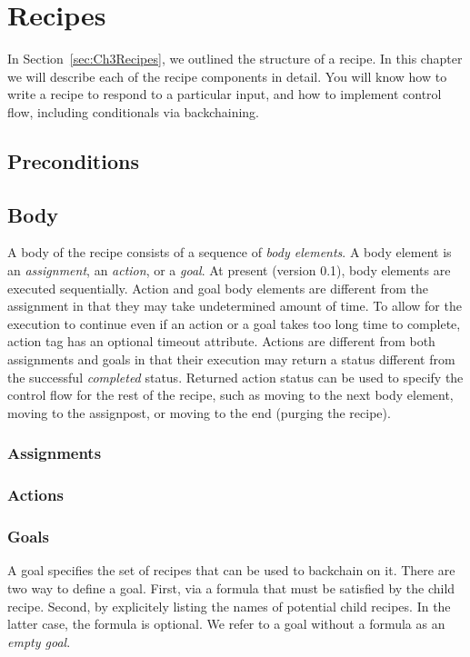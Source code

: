 \chapter{Recipes}
\label{Chapter4}

In Section~\ref{sec:Ch3Recipes}, we outlined the structure of a recipe. In this chapter we will describe each of the recipe components in detail. You will know how to write a recipe to respond to a particular input, and how to implement control flow, including conditionals via backchaining.



\section{Preconditions}
\section{Body}

A body of the recipe consists of a sequence of \textsl{body elements}. A body element is an \textsl{assignment}, an \textsl{action}, or a \textsl{goal}. At present (version 0.1), body elements are executed sequentially. Action and goal body elements are different from the assignment in that they may take undetermined amount of time. To allow for the execution to continue even if an action or a goal takes too long time to complete, action tag has an optional timeout attribute. Actions are different from both assignments and goals in that their execution may return a status different from the successful \textsl{completed} status. Returned action status can be used to specify the control flow for the rest of the recipe, such as moving to the next body element, moving to the assignpost, or moving to the end (purging the recipe).

\subsection{Assignments}
\subsection{Actions}
\subsection{Goals}

A goal specifies the set of recipes that can be used to backchain on it. There are two way to define a goal. First, via a formula that must be satisfied by the child recipe. Second, by explicitely listing the names of potential child recipes. In the latter case, the formula is optional. We refer to a goal without a formula as an \textsl{empty goal}.

